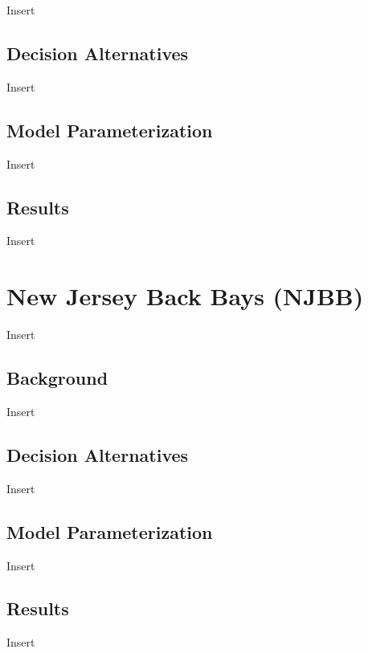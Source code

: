 \documentclass[
]{book}
\begin{document}
Insert

\hypertarget{decision-alternatives}{%
\section{Decision Alternatives}\label{decision-alternatives}}

Insert

\hypertarget{model-parameterization}{%
\section{Model Parameterization}\label{model-parameterization}}

Insert

\hypertarget{results}{%
\section{Results}\label{results}}

Insert

\hypertarget{new-jersey-back-bays-njbb-1}{%
\chapter{New Jersey Back Bays (NJBB)}\label{new-jersey-back-bays-njbb-1}}

Insert

\hypertarget{background-2}{%
\section{Background}\label{background-2}}

Insert

\hypertarget{decision-alternatives-1}{%
\section{Decision Alternatives}\label{decision-alternatives-1}}

Insert

\hypertarget{model-parameterization-1}{%
\section{Model Parameterization}\label{model-parameterization-1}}

Insert

\hypertarget{results-1}{%
\section{Results}\label{results-1}}

Insert

  
\end{document}
